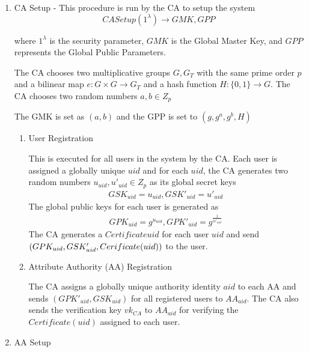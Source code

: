 \begin{enumerate}
	
	\item CA Setup - This procedure is run by the CA to setup the system $$ CASetup(1^{\lambda}) \longrightarrow GMK, GPP $$
	
	where $ 1^{\lambda} $ is the security parameter, $ GMK $ is the Global Master Key, and $ GPP $ represents the Global Public Parameters.
	
	The CA chooses two multiplicative groups $ G, G_{T} $ with the same prime order $ p $ and a bilinear map $ e \colon G \times G \rightarrow G_{T} $ and a hash function $ H \colon \{0, 1\} \rightarrow G. $ The CA chooses two random numbers $ a, b \in Z_{p} $
	
	The GMK is set as $ (a, b) $ and the GPP is set to $ (g, g^{a}, g^{b}, H) $
	
	\begin{enumerate}
		
		\item User Registration
		
		This is executed for all users in the system by the CA. Each user is assigned a globally unique $ uid $ and for each $ uid $, the CA generates two random numbers $ u_{uid}, u'_{uid} \in Z_{p} $ as its global secret keys
		\begin{align*}
			GSK_{uid} = u_{uid}, GSK'_{uid} = u'_{uid}
		\end{align*}
		The global public keys for each user is generated as 
		\begin{align*}
			GPK_{uid} = g^{u_{uid}}, GPK'_{uid} = g^{\frac{1}{u'_{uid}}}
		\end{align*}
		The CA generates a $ Certificate{uid} $ for each user $ uid $ and send $ (GPK_{uid}, GSK'_{uid}, \\ Cerificate(uid)) $ to the user.
		
		\item Attribute Authority (AA) Registration
		
		The CA assigns a globally unique authority identity $ aid $ to each AA and sends $ (GPK'_{uid}, GSK_{uid}) $ for all registered users to $ AA_{aid} $. The CA also sends the verification key $ vk_{CA} $ to $ AA_{aid} $ for verifying the $ Certificate(uid) $ assigned to each user.
		
	\end{enumerate}
	
	\item AA Setup
	

\end{enumerate}
